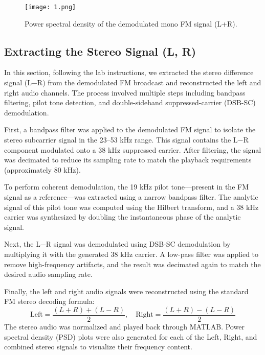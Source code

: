 \documentclass{article}
\begin{document}
\begin{figure}[h!]
    \centering
    \texttt{[image: 1.png]}
    \caption{Power spectral density of the demodulated mono FM signal (L+R).}
    \label{fig:mono_psd}
\end{figure}

\subsection*{Extracting the Stereo Signal (L, R)}

In this section, following the lab instructions, we extracted the stereo difference signal (L−R) from the demodulated FM broadcast and reconstructed the left and right audio channels. The process involved multiple steps including bandpass filtering, pilot tone detection, and double-sideband suppressed-carrier (DSB-SC) demodulation.

First, a bandpass filter was applied to the demodulated FM signal to isolate the stereo subcarrier signal in the 23–53 kHz range. This signal contains the L−R component modulated onto a 38 kHz suppressed carrier. After filtering, the signal was decimated to reduce its sampling rate to match the playback requirements (approximately 80 kHz).

To perform coherent demodulation, the 19 kHz pilot tone—present in the FM signal as a reference—was extracted using a narrow bandpass filter. The analytic signal of this pilot tone was computed using the Hilbert transform, and a 38 kHz carrier was synthesized by doubling the instantaneous phase of the analytic signal.

Next, the L−R signal was demodulated using DSB-SC demodulation by multiplying it with the generated 38 kHz carrier. A low-pass filter was applied to remove high-frequency artifacts, and the result was decimated again to match the desired audio sampling rate.

Finally, the left and right audio signals were reconstructed using the standard FM stereo decoding formula:
\[
\text{Left} = \frac{(L+R) + (L−R)}{2}, \quad \text{Right} = \frac{(L+R) - (L−R)}{2}
\]
The stereo audio was normalized and played back through MATLAB. Power spectral density (PSD) plots were also generated for each of the Left, Right, and combined stereo signals to visualize their frequency content.
\end{document}
